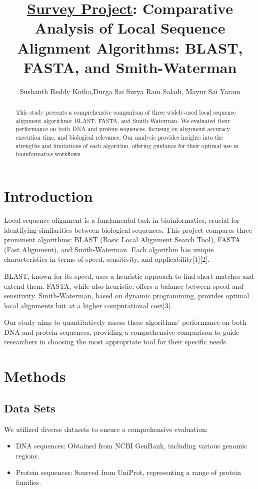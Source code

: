 \documentclass{article}
\title{\underline{Survey Project}: Comparative Analysis of Local Sequence Alignment Algorithms: BLAST, FASTA, and Smith-Waterman}
\author{Sushanth Reddy Kotha,Durga Sai Surya Ram Saladi, Mayur Sai Yaram}
\date{}
\begin{document}
\maketitle

\begin{abstract}
\fontsize{10.5}{11}\selectfont
\textsf{This study presents a comprehensive comparison of three widely-used local sequence alignment algorithms: BLAST, FASTA, and Smith-Waterman. We evaluated their performance on both DNA and protein sequences, focusing on alignment accuracy, execution time, and biological relevance. Our analysis provides insights into the strengths and limitations of each algorithm, offering guidance for their optimal use in bioinformatics workflows.}
\end{abstract}

\section{Introduction}
Local sequence alignment is a fundamental task in bioinformatics, crucial for identifying similarities between biological sequences. This project compares three prominent algorithms: BLAST (Basic Local Alignment Search Tool), FASTA (Fast Alignment), and Smith-Waterman. Each algorithm has unique characteristics in terms of speed, sensitivity, and applicability[1][2].

BLAST, known for its speed, uses a heuristic approach to find short matches and extend them. FASTA, while also heuristic, offers a balance between speed and sensitivity. Smith-Waterman, based on dynamic programming, provides optimal local alignments but at a higher computational cost[3].

Our study aims to quantitatively assess these algorithms' performance on both DNA and protein sequences, providing a comprehensive comparison to guide researchers in choosing the most appropriate tool for their specific needs.

\section{Methods}

\subsection{Data Sets}
We utilized diverse datasets to ensure a comprehensive evaluation:

\begin{itemize}
    \item DNA sequences: Obtained from NCBI GenBank, including various genomic regions.
    \item Protein sequences: Sourced from UniProt, representing a range of protein families.
\end{itemize}
\end{document}
